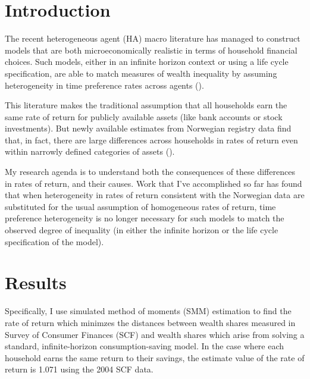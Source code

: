 \documentclass[\econtexRoot/Chp1proposal]{subfiles}
\begin{document}
\hypertarget{Introduction}{}
\section{Introduction}\notinsubfile{\label{sec:intro}}
\setcounter{page}{0}

\par The recent heterogeneous agent (HA) macro literature has managed to construct models that are both microeconomically realistic in terms of household financial choices. Such models, either in an infinite horizon context or using a life cycle specification, are able to match measures of wealth inequality by assuming heterogeneity in time preference rates across agents (\cite{cstw2017}).

\par This literature makes the traditional assumption that all households earn the same rate of return for publicly available assets (like bank accounts or stock investments). But newly available estimates from Norwegian registry data find that, in fact, there are large differences across households in rates of return even within narrowly defined categories of assets (\cite{aflgdmlp20}). %

\par My research agenda is to understand both the consequences of these differences in rates of return, and their causes. Work that I've accomplished so far has found that when heterogeneity in rates of return consistent with the Norwegian data are substituted for the usual assumption of homogeneous rates of return, time preference heterogeneity is no longer necessary for such models to match the observed degree of inequality (in either the infinite horizon or the life cycle specification of the model).

\section{Results}

\par Specifically, I use simulated method of moments (SMM) estimation to find the rate of return which minimzes the distances between wealth shares measured in Survey of Consumer Finances (SCF) and wealth shares which arise from solving a standard, infinite-horizon consumption-saving model. In the case where each household earns the same return to their savings, the estimate value of the rate of return is 1.071 using the 2004 SCF data. 
\end{document}

